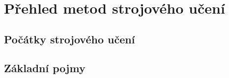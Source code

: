 \documentclass[male,czech,api_ing]{thesis}
\begin{document}
       
       
       
       
       
        
	
	


\chapter{Přehled metod strojového učení}

\section{Počátky strojového učení}

\section{Základní pojmy}
\end{document}
